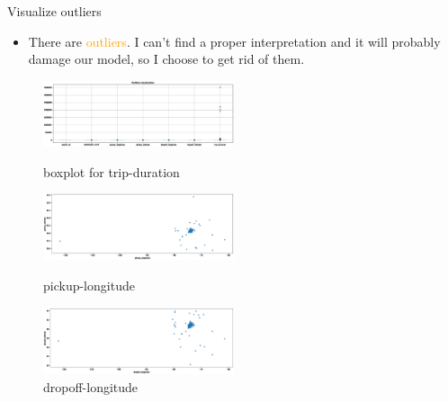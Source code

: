 \documentclass[
 size=14pt,
 paper=smartboard,  %
 mode=present, 		%
 display=slides, 	%
 style=tuliplab,  	%
 pauseslide,
 fleqn,leqno]{powerdot}
\begin{document}
\begin{slide}{Visualize outliers}
\begin{itemize}
\item
There are  \textcolor{orange}{outliers}. I can’t find a proper interpretation and it will probably damage our model, so I choose to get rid of them. 

\end{itemize}

\begin{figure}
\begin{minipage}{0.5\linewidth}
\centering
\includegraphics[width=0.5\textwidth]{outliers1.eps}
\caption{boxplot for trip-duration} 
\end{minipage}
\hfill
\begin{minipage}{0.5\linewidth}
\centering
\includegraphics[width=0.5\textwidth]{outliers2.eps}
\caption{pickup-longitude}
\end{minipage}
\begin{minipage}{0.5\linewidth}
\centering
\includegraphics[width=0.5\textwidth]{outliers3.eps}
\caption{dropoff-longitude}
\end{minipage}
\end{figure}
%
%

\end{slide}
\end{document}
